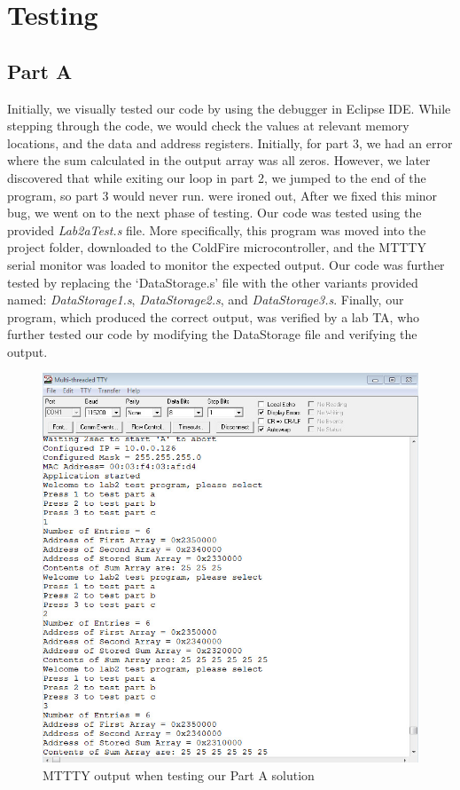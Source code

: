 \documentclass[letterpaper]{article}
\begin{document}
\section{Testing}
  \subsection{Part A}
    Initially, we visually tested our code by using the debugger in Eclipse IDE.
    While stepping through the code, we would check the values at relevant
    memory locations, and the data and address registers. Initially, for part 3,
    we had an error where the sum calculated in the output array was all zeros.
    However, we later discovered that while exiting our loop in part 2, we
    jumped to the end of the program, so part 3 would never run. %
    were ironed out, After we fixed this minor bug, we went on to the next phase
    of testing. Our code was tested using the provided \textit{Lab2aTest.s}
    file. More specifically, this program was moved into the project folder,
    downloaded to the ColdFire microcontroller, and the MTTTY serial monitor was
    loaded to monitor the expected output. Our code was further tested by
    replacing the `DataStorage.s' file with the other variants provided named:
    \textit{DataStorage1.s}, \textit{DataStorage2.s}, and
    \textit{DataStorage3.s}. Finally, our program, which produced the correct
    output, was verified by a lab TA, who further tested our code by modifying
    the DataStorage file and verifying the output.
    \begin{figure}[H]
      \centering
      \includegraphics[width=.65\textwidth]{part1.jpg}
      \caption{MTTTY output when testing our Part A solution}
    \end{figure}
\end{document}
